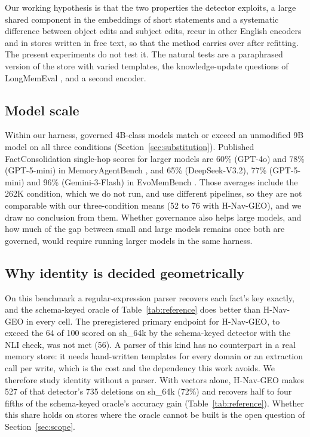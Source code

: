 \documentclass[journal=jcisd8,manuscript=article]{achemso}
\newcommand{\sub}[1]{\textsf{sh\_#1}}                    %
\newcommand{\geo}{H-Nav-GEO}
\begin{document}
Our working hypothesis is that the two properties the detector exploits, a large shared component in the embeddings of short statements and a systematic difference between object edits and subject edits, recur in other English encoders and in stores written in free text, so that the method carries over after refitting. The present experiments do not test it. The natural tests are a paraphrased version of the store with varied templates, the knowledge-update questions of LongMemEval \cite{wu2025longmemeval}, and a second encoder.

\subsection{Model scale}
\label{sec:scale}

Within our harness, governed 4B-class models match or exceed an unmodified 9B model on all three conditions (Section~\ref{sec:substitution}). Published FactConsolidation single-hop scores for larger models are 60\% (GPT-4o) and 78\% (GPT-5-mini) in MemoryAgentBench \cite{hu2026memoryagentbench}, and 65\% (DeepSeek-V3.2), 77\% (GPT-5-mini) and 96\% (Gemini-3-Flash) in EvoMemBench \cite{wang2026evomembench}. Those averages include the 262K condition, which we do not run, and use different pipelines, so they are not comparable with our three-condition means (52 to 76 with \geo{}), and we draw no conclusion from them. Whether governance also helps large models, and how much of the gap between small and large models remains once both are governed, would require running larger models in the same harness.

\subsection{Why identity is decided geometrically}
\label{sec:parser}

On this benchmark a regular-expression parser recovers each fact's key exactly, and the schema-keyed oracle of Table~\ref{tab:reference} does better than \geo{} in every cell. The preregistered primary endpoint for \geo{}, to exceed the 64 of 100 scored on \sub{64k} by the schema-keyed detector with the NLI check, was not met (56). A parser of this kind has no counterpart in a real memory store: it needs hand-written templates for every domain or an extraction call per write, which is the cost and the dependency this work avoids. We therefore study identity without a parser. With vectors alone, \geo{} makes 527 of that detector's 735 deletions on \sub{64k} (72\%) and recovers half to four fifths of the schema-keyed oracle's accuracy gain (Table~\ref{tab:reference}). Whether this share holds on stores where the oracle cannot be built is the open question of Section~\ref{sec:scope}.
\end{document}
